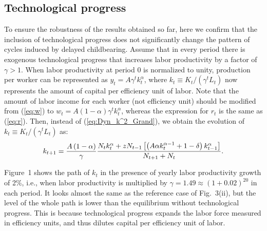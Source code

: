 \documentclass{MBE}%
\begin{document}
{\subsection{Technological progress}

To ensure the robustness of the results obtained so far, here we confirm that
the inclusion of technological progress does not significantly change the
pattern of cycles induced by delayed childbearing. Assume that in every period
there is exogenous technological progress that increases labor productivity by
a factor of $\gamma>1$. When labor productivity at period 0 is normalized to
unity, production per worker can be represented as $y_{t}=A \gamma^{t}
k_{t}^{\alpha}$, where $k_{t}\equiv K_{t}/(\gamma^{t} L_{t})$ now represents
the amount of capital per efficiency unit of labor. Note that the amount of
labor income for each worker (not efficiency unit) should be modified from
(\ref{eq:w}) to $w_{t}=A(1-\alpha)\gamma^{t} k_{t}^{\alpha}$, whereas the
expression for $r_{t}$ is the same as (\ref{eq:r}). Then, instead of
(\ref{eq:Dyn_k^2_Grand}), we obtain the evolution of $k_{t}\equiv
K_{t}/(\gamma^{t} L_{t})$ as:
\begin{equation}
\label{eq:evo_k_growth}k_{t+1} = \frac{A\left(  1-\alpha\right)  }{\gamma}
\frac{N_{t}k_{t}^{\alpha} +zN_{t-1}\left[  \left(  A\alpha k_{t}^{\alpha -1}+1-\delta\right)
k_{t-1}^{\alpha}\right]  }
{N_{t+1}+N_{t}}.\\
\end{equation}



Figure~1 shows the path of $k_{t}$ in the presence of yearly labor productivity growth of 2\%,
i.e., when labor productivity is multiplied by $\gamma=1.49 \approx(1+0.02)^{20}$ in each period.
It looks almost the same as the reference case of Fig.~3(ii), but the level of the whole path is
lower than the equilibrium without technological progress. This is because technological progress
expands the labor force measured in efficiency units, and thus dilutes capital per efficiency unit
of labor.

}
\end{document}
